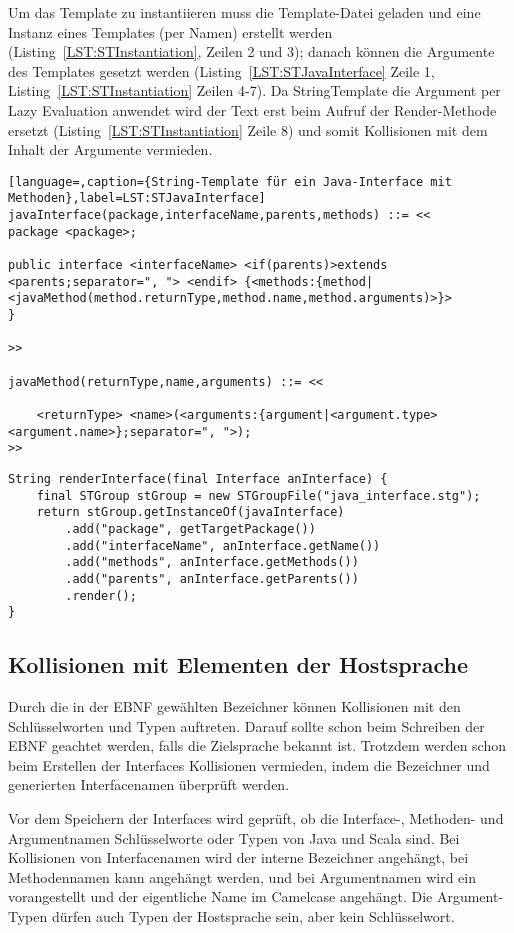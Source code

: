 \documentclass[../InterneDSLs.tex]{subfiles}
\begin{document}
Um das Template zu instantiieren muss die Template-Datei geladen und eine Instanz eines Templates (per Namen) erstellt werden (Listing~\ref{LST:STInstantiation}, Zeilen 2 und 3); danach können die Argumente des Templates gesetzt werden (Listing~\ref{LST:STJavaInterface} Zeile 1, Listing~\ref{LST:STInstantiation} Zeilen 4-7). Da StringTemplate die Argument per Lazy Evaluation anwendet wird der Text erst beim Aufruf der Render-Methode ersetzt (Listing~\ref{LST:STInstantiation} Zeile 8) und somit Kollisionen mit dem Inhalt der Argumente vermieden.
\begin{lstlisting}[language=,caption={String-Template für ein Java-Interface mit Methoden},label=LST:STJavaInterface]
javaInterface(package,interfaceName,parents,methods) ::= <<
package <package>;

public interface <interfaceName> <if(parents)>extends <parents;separator=", "> <endif> {<methods:{method|<javaMethod(method.returnType,method.name,method.arguments)>}>
}

>>

javaMethod(returnType,name,arguments) ::= <<

    <returnType> <name>(<arguments:{argument|<argument.type> <argument.name>};separator=", ">);
>>
\end{lstlisting}

\begin{lstlisting}[caption={Instantiierung eines String-Templates},label=LST:STInstantiation]
String renderInterface(final Interface anInterface) {
    final STGroup stGroup = new STGroupFile("java_interface.stg");
    return stGroup.getInstanceOf(javaInterface)
        .add("package", getTargetPackage())
        .add("interfaceName", anInterface.getName())
        .add("methods", anInterface.getMethods())
        .add("parents", anInterface.getParents())
        .render();
}
\end{lstlisting}

\subsection{Kollisionen mit Elementen der Hostsprache}
Durch die in der EBNF gewählten Bezeichner können Kollisionen mit den Schlüsselworten und Typen auftreten. Darauf sollte schon beim Schreiben der EBNF geachtet werden, falls die Zielsprache bekannt ist. Trotzdem werden schon beim Erstellen der Interfaces Kollisionen vermieden, indem die Bezeichner und generierten Interfacenamen überprüft werden.

Vor dem Speichern der Interfaces wird geprüft, ob die Interface-, Methoden- und Argumentnamen Schlüsselworte oder Typen von Java und Scala sind. Bei Kollisionen von Interfacenamen wird der interne Bezeichner angehängt, bei Methodennamen kann  angehängt werden, und bei Argumentnamen wird ein  vorangestellt und der eigentliche Name im Camelcase angehängt. Die Argument-Typen dürfen auch Typen der Hostsprache sein, aber kein Schlüsselwort.
\end{document}
